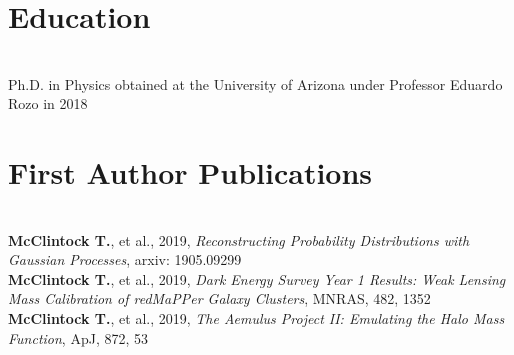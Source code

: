 \documentclass{res}
\begin{document}
\begin{resume}


\vspace{-12pt}
\section{Education}
\vspace{-8pt}
\hrulefill\\
Ph.D. in Physics  obtained at the University of Arizona under Professor Eduardo Rozo in 2018

\vspace{-12pt}
\section{First Author Publications}
\vspace{-8pt}
\hrulefill\\
{\bf McClintock T.}, et al., 2019, {\it Reconstructing Probability Distributions with Gaussian Processes}, arxiv: 1905.09299\\
{\bf McClintock T.}, et al., 2019, {\it Dark Energy Survey Year 1 Results: Weak Lensing Mass Calibration of redMaPPer Galaxy Clusters}, MNRAS, 482, 1352\\
{\bf McClintock T.}, et al., 2019, {\it The Aemulus Project II: Emulating the Halo Mass Function}, ApJ, 872, 53


\end{resume}
\end{document}
